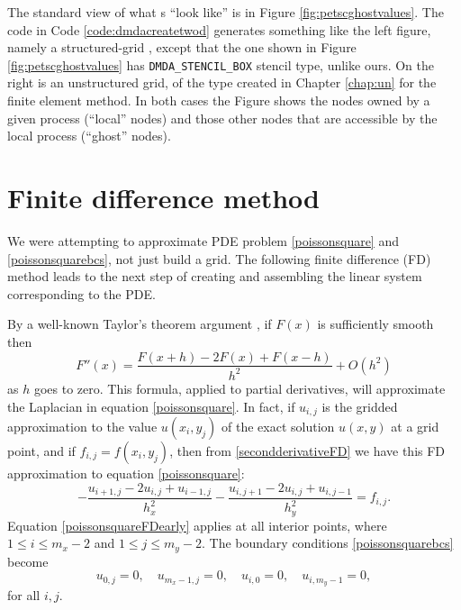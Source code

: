 The standard \PETSc view of what \pDM s ``look like'' is in Figure \ref{fig:petscghostvalues}.  The code in Code \ref{code:dmdacreatetwod} generates something like the left figure, namely a structured-grid \pDM, except that the one shown in Figure \ref{fig:petscghostvalues} has \texttt{DMDA\_STENCIL\_BOX} stencil type, unlike ours.  On the right is an unstructured grid, of the type created in Chapter \ref{chap:un} for the finite element method.  In both cases the Figure shows the nodes owned by a given process (``local'' nodes) and those other nodes that are accessible by the local process (``ghost'' nodes).


\section{Finite difference method}

We were attempting to approximate PDE problem \eqref{poissonsquare} and \eqref{poissonsquarebcs}, not just build a grid.  The following finite difference (FD) method leads to the next step of creating and assembling the linear system corresponding to the PDE.

By a well-known Taylor's theorem argument \citep{MortonMayers2005}, if $F(x)$ is sufficiently smooth then
\begin{equation}
   F''(x) = \frac{F(x+h) - 2 F(x) + F(x-h)}{h^2} + O(h^2)  \label{secondderivativeFD}
\end{equation}
as $h$ goes to zero.  This formula, applied to partial derivatives, will approximate the Laplacian in equation \eqref{poissonsquare}.  In fact, if $u_{i,j}$ is the gridded approximation to the value $u(x_i,y_j)$ of the exact solution $u(x,y)$ at a grid point, and if $f_{i,j} = f(x_i,y_j)$, then from \eqref{secondderivativeFD} we have this FD approximation to equation \eqref{poissonsquare}:
\begin{equation}
- \frac{u_{i+1,j} - 2 u_{i,j} + u_{i-1,j}}{h_x^2} - \frac{u_{i,j+1} - 2 u_{i,j} + u_{i,j-1}}{h_y^2} = f_{i,j}. \label{poissonsquareFDearly}
\end{equation}
Equation \eqref{poissonsquareFDearly} applies at all interior points, where $1 \le i \le m_x-2$ and $1 \le j \le m_y-2$.  The boundary conditions \eqref{poissonsquarebcs} become
\begin{equation}
u_{0,j} = 0, \quad u_{m_x-1,j} = 0, \quad u_{i,0} = 0, \quad u_{i,m_y-1} = 0, \label{poissonsquareFDbcs}
\end{equation}
for all $i,j$.

